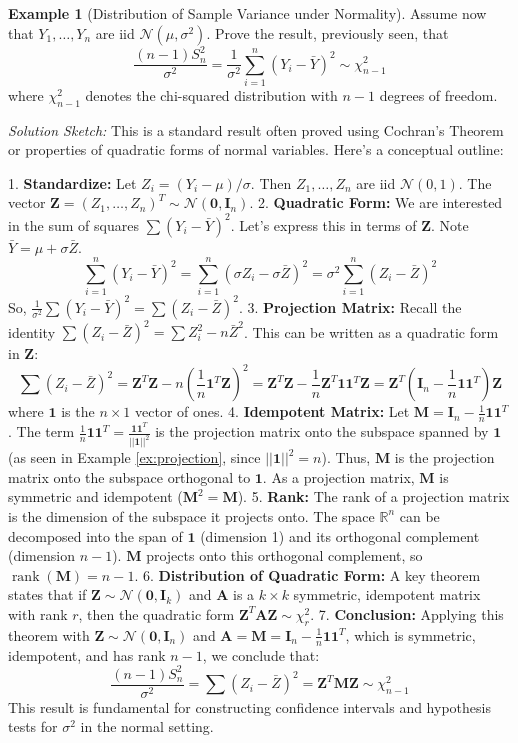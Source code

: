 \documentclass[11pt]{article}
\theoremstyle{definition}
\newtheorem{example}[theorem]{Example}
\theoremstyle{remark}
\DeclareMathOperator{\rank}{\operatorname{rank}}
\begin{document}
\begin{example}[Distribution of Sample Variance under Normality] \label{ex:dist_S2}
    Assume now that $Y_1, \ldots, Y_n$ are iid $\mathcal{N}(\mu, \sigma^2)$. Prove the result, previously seen, that
    \[ \frac{(n-1)S_n^2}{\sigma^2} = \frac{1}{\sigma^2} \sum_{i=1}^n (Y_i - \bar{Y})^2 \sim \chi_{n-1}^2 \]
    where $\chi_{n-1}^2$ denotes the chi-squared distribution with $n-1$ degrees of freedom.

    \emph{Solution Sketch:}
    This is a standard result often proved using Cochran's Theorem or properties of quadratic forms of normal variables. Here's a conceptual outline:
    
    1.  \textbf{Standardize:} Let $Z_i = (Y_i - \mu)/\sigma$. Then $Z_1, \ldots, Z_n$ are iid $\mathcal{N}(0, 1)$. The vector $\bm{Z} = (Z_1, \ldots, Z_n)^T \sim \mathcal{N}(\mathbf{0}, \bm{I}_n)$.
    2.  \textbf{Quadratic Form:} We are interested in the sum of squares $\sum (Y_i - \bar{Y})^2$. Let's express this in terms of $\bm{Z}$. Note $\bar{Y} = \mu + \sigma \bar{Z}$.
        \[ \sum_{i=1}^n (Y_i - \bar{Y})^2 = \sum_{i=1}^n (\sigma Z_i - \sigma \bar{Z})^2 = \sigma^2 \sum_{i=1}^n (Z_i - \bar{Z})^2 \]
        So, $\frac{1}{\sigma^2} \sum (Y_i - \bar{Y})^2 = \sum (Z_i - \bar{Z})^2$.
    3.  \textbf{Projection Matrix:} Recall the identity $\sum (Z_i - \bar{Z})^2 = \sum Z_i^2 - n\bar{Z}^2$. This can be written as a quadratic form in $\bm{Z}$:
        \[ \sum (Z_i - \bar{Z})^2 = \bm{Z}^T \bm{Z} - n (\frac{1}{n} \bm{1}^T \bm{Z})^2 = \bm{Z}^T \bm{Z} - \frac{1}{n} \bm{Z}^T \bm{1} \bm{1}^T \bm{Z} = \bm{Z}^T (\bm{I}_n - \frac{1}{n}\bm{1}\bm{1}^T) \bm{Z} \]
        where $\bm{1}$ is the $n \times 1$ vector of ones.
    4.  \textbf{Idempotent Matrix:} Let $\bm{M} = \bm{I}_n - \frac{1}{n}\bm{1}\bm{1}^T$. The term $\frac{1}{n}\bm{1}\bm{1}^T = \frac{\bm{1}\bm{1}^T}{||\bm{1}||^2}$ is the projection matrix onto the subspace spanned by $\bm{1}$ (as seen in Example \ref{ex:projection}, since $||\bm{1}||^2 = n$). Thus, $\bm{M}$ is the projection matrix onto the subspace orthogonal to $\bm{1}$. As a projection matrix, $\bm{M}$ is symmetric and idempotent ($\bm{M}^2 = \bm{M}$).
    5.  \textbf{Rank:} The rank of a projection matrix is the dimension of the subspace it projects onto. The space $\mathbb{R}^n$ can be decomposed into the span of $\bm{1}$ (dimension 1) and its orthogonal complement (dimension $n-1$). $\bm{M}$ projects onto this orthogonal complement, so $\rank(\bm{M}) = n-1$.
    6.  \textbf{Distribution of Quadratic Form:} A key theorem states that if $\bm{Z} \sim \mathcal{N}(\mathbf{0}, \bm{I}_k)$ and $\bm{A}$ is a $k \times k$ symmetric, idempotent matrix with rank $r$, then the quadratic form $\bm{Z}^T \bm{A} \bm{Z} \sim \chi_r^2$.
    7.  \textbf{Conclusion:} Applying this theorem with $\bm{Z} \sim \mathcal{N}(\mathbf{0}, \bm{I}_n)$ and $\bm{A} = \bm{M} = \bm{I}_n - \frac{1}{n}\bm{1}\bm{1}^T$, which is symmetric, idempotent, and has rank $n-1$, we conclude that:
        \[ \frac{(n-1)S_n^2}{\sigma^2} = \sum (Z_i - \bar{Z})^2 = \bm{Z}^T \bm{M} \bm{Z} \sim \chi_{n-1}^2 \]
    This result is fundamental for constructing confidence intervals and hypothesis tests for $\sigma^2$ in the normal setting.
\end{example}
\end{document}

